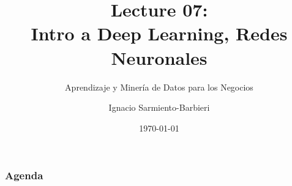 \documentclass[
  shownotes,
  xcolor={svgnames},
  hyperref={colorlinks,citecolor=DarkBlue,linkcolor=DarkRed,urlcolor=DarkBlue}
  , aspectratio=169]{beamer}
\begin{document}
\title[Lecture 07]{Lecture 07: \\ Intro a Deep Learning, Redes Neuronales }
\subtitle{Aprendizaje y Minería de Datos para los Negocios}
\date{\today}

\author[Sarmiento-Barbieri]{Ignacio Sarmiento-Barbieri}


\begin{frame}[noframenumbering]
\maketitle
\end{frame}





\begin{frame}
\frametitle{Agenda}

\tableofcontents

\end{frame}
\end{document}

